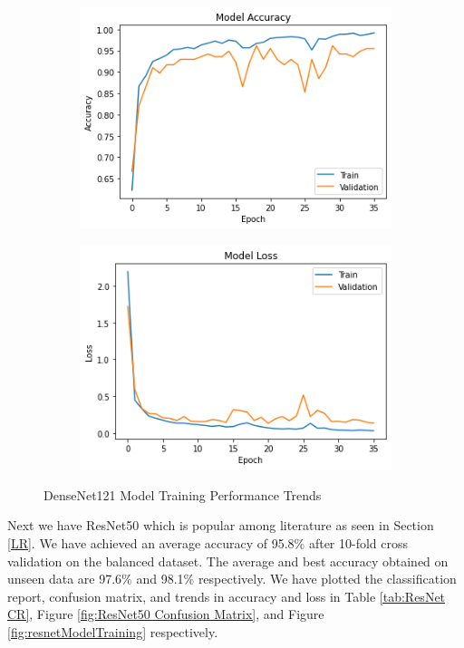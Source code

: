 \vspace{-\parskip}
\begin{figure}[H]
        \begin{subfigure}[b]{0.5\textwidth}
                \includegraphics[width=\linewidth]{Images/DenseNetAccuracy.png}
        \end{subfigure}%
        \begin{subfigure}[b]{0.5\textwidth}
                \includegraphics[width=\linewidth]{Images/DenseNetLoss.png}
        \end{subfigure}%
        \caption{DenseNet121 Model Training Performance Trends}\label{fig:densenetModelTraining}
\end{figure}
\vspace{-1em}
Next we have ResNet50 which is popular among literature as seen in Section \ref{LR}. We have achieved an average accuracy of 95.8\% after 10-fold cross validation on the balanced dataset. The average and best accuracy obtained on unseen data are 97.6\% and 98.1\% respectively. We have plotted the classification report, confusion matrix, and trends in accuracy and loss in Table \ref{tab:ResNet CR}, Figure \ref{fig:ResNet50 Confusion Matrix}, and Figure \ref{fig:resnetModelTraining} respectively.

